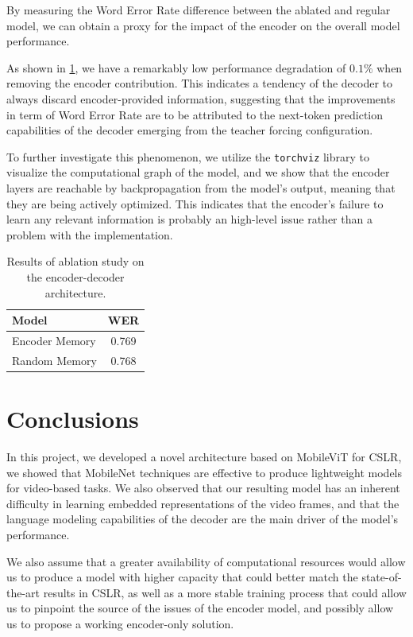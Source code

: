 \documentclass{IEEEtran}
\begin{document}
By measuring the Word Error Rate difference between the ablated and regular model, we can obtain a proxy for the impact of the encoder on the overall model performance.

As shown in \cref{tab:ablation}, we have a remarkably low performance degradation of $0.1\%$ when removing the encoder contribution. This indicates a tendency of the decoder to always discard encoder-provided information, suggesting that the improvements in term of Word Error Rate are to be attributed to the next-token prediction capabilities of the decoder emerging from the teacher forcing configuration.

To further investigate this phenomenon, we utilize the \texttt{torchviz} library to visualize the computational graph of the model, and we show that the encoder layers are reachable by backpropagation from the model's output, meaning that they are being actively optimized. This indicates that the encoder's failure to learn any relevant information is probably an high-level issue rather than a problem with the implementation.

\begin{table}[h]
    \centering
    \caption{Results of ablation study on the encoder-decoder architecture.}\label{tab:ablation}
        \begin{tabular}{lc}
            \toprule
            \textbf{Model} & \textbf{WER} \\
            \midrule
            Encoder Memory & 0.769 \\
            Random Memory & 0.768 \\
            \bottomrule
    \end{tabular}
\end{table}

\section{Conclusions}

In this project, we developed a novel architecture based on MobileViT\cite{mehta_mobilevit_2022} for CSLR, we showed that MobileNet techniques are effective to produce lightweight models for video-based tasks. We also observed that our resulting model has an inherent difficulty in learning embedded representations of the video frames, and that the language modeling capabilities of the decoder are the main driver of the model's performance.

We also assume that a greater availability of computational resources would allow us to produce a model with higher capacity that could better match the state-of-the-art results in CSLR, as well as a more stable training process that could allow us to pinpoint the source of the issues of the encoder model, and possibly allow us to propose a working encoder-only solution.



\end{document}
